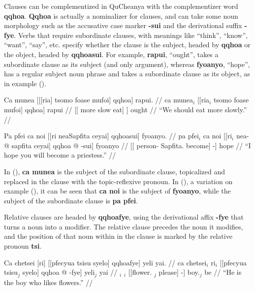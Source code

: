 \documentclass{article}
\begin{document}
Clauses can be complementized in QuCheanya with the complementizer word \textbf{qqhoa}.  \textbf{Qqhoa} is actually a nominalizer for clauses, and can take some noun morphology such as the accusative case marker \textbf{-sui} and the derivational suffix \textbf{-fye}.  Verbs that require subordinate clauses, with meanings like ``think'', ``know'', ``want'', ``say'', etc. specify whether the clause is the subject, headed by \textbf{qqhoa} or the object, headed by \textbf{qqhoasui}.  For example, \textbf{rapui}, ``ought'', takes a subordinate clause as its subject (and only argument), whereas \textbf{fyoanyo}, ``hope'', has a regular subject noun phrase and takes a subordinate clause as its object, as in example ().

\ex[lingstyle=QuCheanya,tag=ought] \begingl
\glpreamble Ca munea [[[ria] tsomo foase mufoi] qqhoa] rapui. //
\gla ca munea$_i$ [[ria$_i$ tsomo foase mufoi] qqhoa] rapui //
\glb {}  [[ more slow eat] ] ought //
\glft ``We should eat more slowly.'' //
\endgl \xe

\ex[lingstyle=QuCheanya,tag=hopeyou] \begingl
\glpreamble Pa pfei ca noi [[ri neaSapfita ceyai] qqhoasui] fyoanyo. //
\gla pa pfei$_i$ ca noi [[ri$_i$ nea- @ sapfita ceyai] qqhoa @ -sui] fyoanyo //
\glb {}    [[ person- Sapfita. become]  -] hope //
\glft ``I hope you will become a priestess.'' //
\endgl \xe

In (), \textbf{ca munea} is the subject of the subordinate clause, topicalized and replaced in the clause with the topic-reflexive pronoun.  In (), a variation on example (), it can be seen that \textbf{ca noi} is the subject of \textbf{fyoanyo}, while the subject of the subordinate clause is \textbf{pa pfei}.

Relative clauses are headed by \textbf{qqhoafye}, using the derivational affix \textbf{-fye} that turns a noun into a modifier.  The relative clause precedes the noun it modifies, and the position of that noun within in the clause is marked by the relative pronoun \textbf{tsi}.

\ex[lingstyle=QuCheanya] \begingl
\glpreamble Ca chetsei [ri] [[pfecyua tsisu syelo] qqhoafye] yeli yai. //
\gla ca chetsei$_i$ ri$_i$ [[pfecyua tsisu$_j$ syelo] qqhoa @ -fye] yeli$_j$ yai //
\glb {} $_i$ $_i$ [[flower. $_j$ please]  -] boy.$_j$ be //
\glft ``He is the boy who likes flowers.'' //
\endgl \xe
\end{document}

